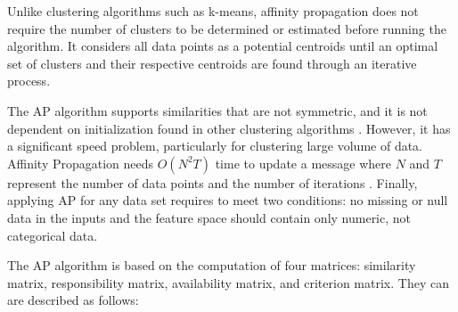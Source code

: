 

Unlike clustering algorithms such as k-means, affinity propagation does not require the number of clusters to be determined or estimated before running the algorithm. It considers all data points as a potential centroids until an optimal set of clusters and their respective centroids are found through an iterative process. %




The AP algorithm supports similarities that are not symmetric, and it is not dependent on initialization found in other clustering algorithms \cite{refianti2017time}. However, it has a significant speed problem, particularly for clustering large volume of data. Affinity Propagation needs $O(N^2T)$ time to update a message where $N$ and $T$ represent the number of data points and the number of iterations \cite{frey2007clustering}. Finally, applying AP for any data set requires to meet two conditions: no missing or null data in the inputs and the feature space should contain only numeric, not categorical data.


The AP algorithm is based on the computation of four matrices: similarity matrix, responsibility matrix, availability matrix, and criterion matrix. They can are described as follows:

